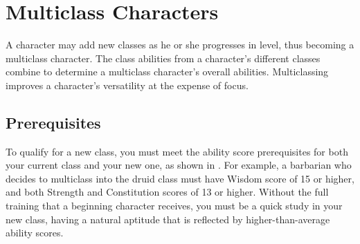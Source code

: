 \section{Multiclass Characters}
A character may add new classes as he or she progresses in level, thus becoming a multiclass character. The class abilities from a character's different classes combine to determine a multiclass character's overall abilities. Multiclassing improves a character's versatility at the expense of focus.

\subsection{Prerequisites}
To qualify for a new class, you must meet the ability score prerequisites for both your current class and your new one, as shown in . For example, a barbarian who decides to multiclass into the druid class must have Wisdom score of 15 or higher, and both Strength and Constitution scores of 13 or higher. Without the full training that a beginning character receives, you must be a quick study in your new class, having a natural aptitude that is reflected by higher-than-average ability scores.


